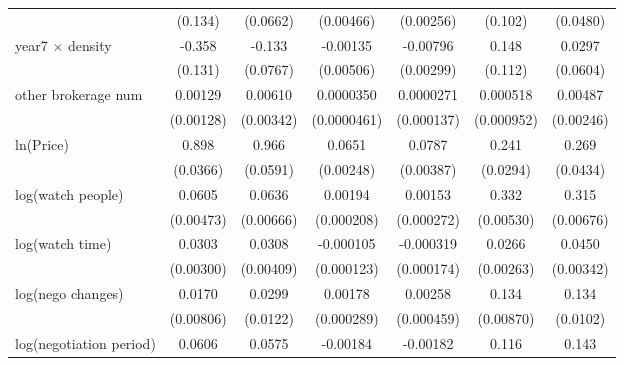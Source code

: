 {\begin{tabular}{l*{6}{c}}
            &     (0.134)         &    (0.0662)         &   (0.00466)         &   (0.00256)         &     (0.102)         &    (0.0480)         \\
\addlinespace
year7 $\times$ density&      -0.358\sym{***}&      -0.133\sym{*}  &    -0.00135         &    -0.00796\sym{***}&       0.148         &      0.0297         \\
            &     (0.131)         &    (0.0767)         &   (0.00506)         &   (0.00299)         &     (0.112)         &    (0.0604)         \\
\addlinespace
other brokerage num  &     0.00129         &     0.00610\sym{*}  &   0.0000350         &   0.0000271         &    0.000518         &     0.00487\sym{**} \\
            &   (0.00128)         &   (0.00342)         & (0.0000461)         &  (0.000137)         &  (0.000952)         &   (0.00246)         \\
\addlinespace
ln(Price)&       0.898\sym{***}&       0.966\sym{***}&      0.0651\sym{***}&      0.0787\sym{***}&       0.241\sym{***}&       0.269\sym{***}\\
            &    (0.0366)         &    (0.0591)         &   (0.00248)         &   (0.00387)         &    (0.0294)         &    (0.0434)         \\
\addlinespace
log(watch people)&      0.0605\sym{***}&      0.0636\sym{***}&     0.00194\sym{***}&     0.00153\sym{***}&       0.332\sym{***}&       0.315\sym{***}\\
            &   (0.00473)         &   (0.00666)         &  (0.000208)         &  (0.000272)         &   (0.00530)         &   (0.00676)         \\
\addlinespace
log(watch time)&      0.0303\sym{***}&      0.0308\sym{***}&   -0.000105         &   -0.000319\sym{*}  &      0.0266\sym{***}&      0.0450\sym{***}\\
            &   (0.00300)         &   (0.00409)         &  (0.000123)         &  (0.000174)         &   (0.00263)         &   (0.00342)         \\
\addlinespace
log(nego changes)&      0.0170\sym{**} &      0.0299\sym{**} &     0.00178\sym{***}&     0.00258\sym{***}&       0.134\sym{***}&       0.134\sym{***}\\
            &   (0.00806)         &    (0.0122)         &  (0.000289)         &  (0.000459)         &   (0.00870)         &    (0.0102)         \\
\addlinespace
log(negotiation period)&      0.0606\sym{***}&      0.0575\sym{***}&    -0.00184\sym{***}&    -0.00182\sym{***}&       0.116\sym{***}&       0.143\sym{***}\\

\end{tabular}}
